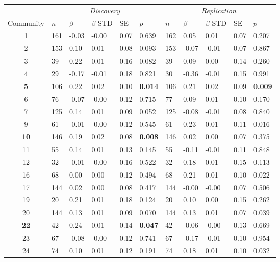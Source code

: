 \begin{table}[ht]
\centering
\setlength{\extrarowheight}{2pt}
\begin{tabular}{cllllllllll}
  \toprule
   &  \multicolumn{5}{c}{\textit{Discovery}} & \multicolumn{5}{c}{\textit{Replication}} \\
    \cmidrule{2-11}
Community & $n$ & $\beta$ & $\beta$ STD & SE & $p$ & $n$ & $\beta$ & $\beta$ STD & SE & $p$\\ 
  \midrule
1 & 161 & -0.03 & -0.00 & 0.07 & 0.639 & 162 & 0.05 & 0.01 & 0.07 & 0.207 \\ 
  2 & 153 & 0.10 & 0.01 & 0.08 & 0.093 & 153 & -0.07 & -0.01 & 0.07 & 0.867 \\ 
  3 & 39 & 0.22 & 0.01 & 0.16 & 0.082 & 39 & 0.09 & 0.00 & 0.14 & 0.260 \\ 
  4 & 29 & -0.17 & -0.01 & 0.18 & 0.821 & 30 & -0.36 & -0.01 & 0.15 & 0.991 \\ 
  \textbf{5} & 106 & 0.22 & 0.02 & 0.10 & \textbf{0.014} & 106 & 0.21 & 0.02 & 0.09 & \textbf{0.009} \\ 
  6 & 76 & -0.07 & -0.00 & 0.12 & 0.715 & 77 & 0.09 & 0.01 & 0.10 & 0.170 \\ 
  7 & 125 & 0.14 & 0.01 & 0.09 & 0.052 & 125 & -0.08 & -0.01 & 0.08 & 0.840 \\ 
  9 & 61 & -0.01 & -0.00 & 0.12 & 0.545 & 61 & 0.23 & 0.01 & 0.11 & 0.016 \\ 
  \textbf{10} & 146 & 0.19 & 0.02 & 0.08 & \textbf{0.008} & 146 & 0.02 & 0.00 & 0.07 & 0.375 \\ 
  11 & 55 & 0.14 & 0.01 & 0.13 & 0.145 & 55 & -0.11 & -0.01 & 0.11 & 0.848 \\ 
  12 & 32 & -0.01 & -0.00 & 0.16 & 0.522 & 32 & 0.18 & 0.01 & 0.15 & 0.113 \\ 
  16 & 68 & 0.00 & 0.00 & 0.12 & 0.494 & 68 & 0.21 & 0.01 & 0.10 & 0.022 \\ 
  17 & 144 & 0.02 & 0.00 & 0.08 & 0.417 & 144 & -0.00 & -0.00 & 0.07 & 0.506 \\ 
  19 & 20 & 0.21 & 0.01 & 0.18 & 0.124 & 20 & 0.10 & 0.00 & 0.15 & 0.262 \\ 
  20 & 144 & 0.13 & 0.01 & 0.09 & 0.070 & 144 & 0.13 & 0.01 & 0.07 & 0.039 \\ 
  \textbf{22} & 42 & 0.24 & 0.01 & 0.14 & \textbf{0.047} & 42 & -0.06 & -0.00 & 0.13 & 0.669 \\ 
  23 & 67 & -0.08 & -0.00 & 0.12 & 0.741 & 67 & -0.17 & -0.01 & 0.10 & 0.954 \\ 
  24 & 74 & 0.10 & 0.01 & 0.12 & 0.191 & 74 & 0.18 & 0.01 & 0.10 & 0.032 \\ 

\end{tabular}
\end{table}
